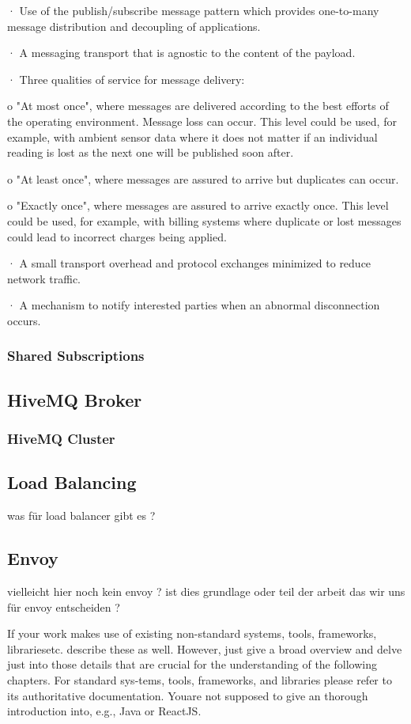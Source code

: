 ·         Use of the publish/subscribe message pattern which provides one-to-many message distribution and decoupling of applications.

·         A messaging transport that is agnostic to the content of the payload.

·         Three qualities of service for message delivery:

o    "At most once", where messages are delivered according to the best efforts of the operating environment. Message loss can occur. This level could be used, for example, with ambient sensor data where it does not matter if an individual reading is lost as the next one will be published soon after.

o    "At least once", where messages are assured to arrive but duplicates can occur.

o    "Exactly once", where messages are assured to arrive exactly once. This level could be used, for example, with billing systems where duplicate or lost messages could lead to incorrect charges being applied.

·         A small transport overhead and protocol exchanges minimized to reduce network traffic.

·         A mechanism to notify interested parties when an abnormal disconnection occurs.

\subsubsection{Shared Subscriptions}
\subsection{HiveMQ Broker}
\subsubsection{HiveMQ Cluster}
\subsection{Load Balancing}
was für load balancer gibt es ?
\subsection{Envoy}
vielleicht hier noch kein envoy ? ist dies grundlage oder teil der arbeit das wir uns für envoy entscheiden ?

If your work makes use of existing non-standard systems, tools, frameworks, librariesetc. describe these as well. However, just give a broad overview and delve just into those details that are crucial for the understanding of the following chapters. For standard sys-tems, tools, frameworks, and libraries please refer to its authoritative documentation. Youare not supposed to give an thorough introduction into, e.g., Java or ReactJS.

